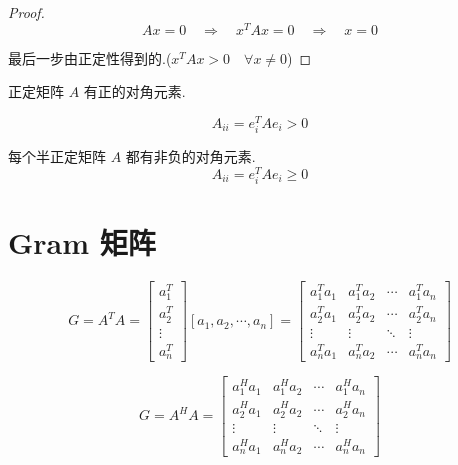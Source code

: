 \begin{proof}
    $$ A x=0 \quad \Rightarrow \quad x^{T} A x=0 \quad \Rightarrow \quad x=0 $$

    最后一步由正定性得到的.($
    x^{T} A x>0 \quad \forall x \neq 0
    $)

\end{proof}

\begin{theorem}[正定矩阵对角元素性质]
    正定矩阵 $ A $ 有正的对角元素.

    $$
A_{i i}=e_{i}^{T} A e_{i}>0
$$
\end{theorem}

\begin{theorem}[半正定矩阵对角元素性质]
    每个半正定矩阵 $ A $ 都有非负的对角元素.
$$
A_{i i}=e_{i}^{T} A e_{i} \geq 0
$$
\end{theorem}


\section{Gram 矩阵}

\begin{definition}
    \label{Def:Gram}

    $$ G=A^{T} A=\left[\begin{array}{c}a_{1}^{T} \\ a_{2}^{T} \\ \vdots \\ a_{n}^{T}\end{array}\right]\left[a_{1}, a_{2}, \cdots, a_{n}\right]=\left[\begin{array}{cccc}a_{1}^{T} a_{1} & a_{1}^{T} a_{2} & \cdots & a_{1}^{T} a_{n} \\ a_{2}^{T} a_{1} & a_{2}^{T} a_{2} & \cdots & a_{2}^{T} a_{n} \\ \vdots & \vdots & \ddots & \vdots \\ a_{n}^{T} a_{1} & a_{n}^{T} a_{2} & \cdots & a_{n}^{T} a_{n}\end{array}\right] $$
\end{definition}

\begin{definition}
    $$ G=A^{H} A=\left[\begin{array}{cccc}a_{1}^{H} a_{1} & a_{1}^{H} a_{2} & \cdots & a_{1}^{H} a_{n} \\ a_{2}^{H} a_{1} & a_{2}^{H} a_{2} & \cdots & a_{2}^{H} a_{n} \\ \vdots & \vdots & \ddots & \vdots \\ a_{n}^{H} a_{1} & a_{n}^{H} a_{2} & \cdots & a_{n}^{H} a_{n}\end{array}\right] $$
\end{definition}

